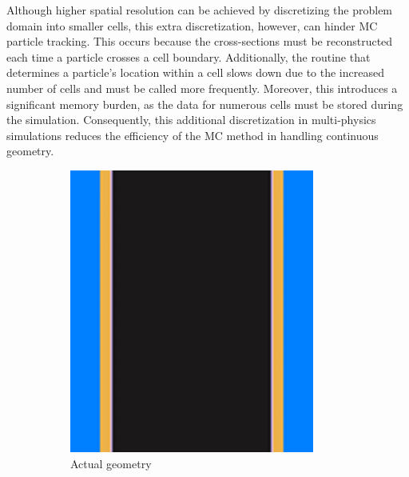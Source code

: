 Although higher spatial resolution can be achieved by discretizing the problem domain into smaller cells, this extra discretization, however, can hinder MC particle tracking. This occurs because the cross-sections must be reconstructed each time a particle crosses a cell boundary. Additionally, the routine that determines a particle's location within a cell slows down due to the increased number of cells and must be called more frequently. Moreover, this introduces a significant memory burden, as the data for numerous cells must be stored during the simulation. Consequently, this additional discretization in multi-physics simulations reduces the efficiency of the MC method in handling continuous geometry.

\begin{figure}
    \centering
    \begin{subfigure}[b]{0.25\textwidth}
        \centering
        \includegraphics[width=\textwidth]{figs/sec_1a.png}
        \caption{Actual geometry}
        \label{fig_1a}
    \end{subfigure}
    \hspace{6em}
    \begin{subfigure}[b]{0.25\textwidth}

\end{subfigure}
\end{figure}
